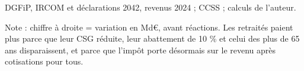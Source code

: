 DGFiP, IRCOM et déclarations 2042, revenus 2024 ; CCSS ; calculs de l'auteur.\par Note : chiffre à droite = variation en Md\euro{}, avant réactions. Les retraités paient plus parce que leur CSG réduite, leur abattement de 10 \% et celui des plus de 65 ans disparaissent, et parce que l'impôt porte désormais sur le revenu après cotisations pour tous.

